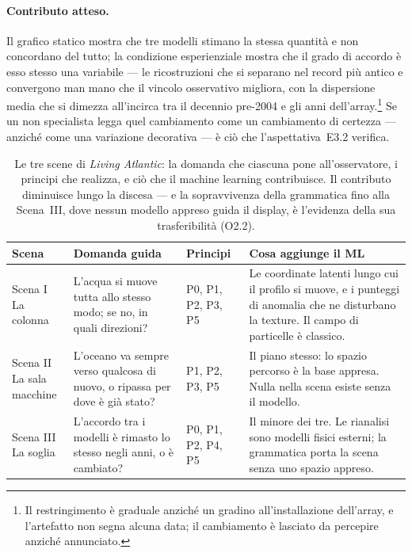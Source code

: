 \paragraph{Contributo atteso.} Il grafico statico mostra che tre modelli stimano la stessa quantità e non concordano del tutto; la condizione esperienziale mostra che il grado di accordo è esso stesso una variabile --- le ricostruzioni che si separano nel record più antico e convergono man mano che il vincolo osservativo migliora, con la dispersione media che si dimezza all'incirca tra il decennio pre-2004 e gli anni dell'array.\footnote{Il restringimento è graduale anziché un gradino all'installazione dell'array, e l'artefatto non segna alcuna data; il cambiamento è lasciato da percepire anziché annunciato.} Se un non specialista legga quel cambiamento come un cambiamento di certezza --- anziché come una variazione decorativa --- è ciò che l'aspettativa~E3.2 verifica.

\begin{table}[tbp]
\centering
\caption[Le tre scene a colpo d'occhio]{Le tre scene di \emph{Living Atlantic}: la domanda che ciascuna pone all'osservatore, i principi che realizza, e ciò che il machine learning contribuisce. Il contributo diminuisce lungo la discesa --- e la sopravvivenza della grammatica fino alla Scena~III, dove nessun modello appreso guida il display, è l'evidenza della sua trasferibilità (O2.2).}
\label{tab:scene-summary}
\small
\renewcommand{\arraystretch}{1.35}

\begin{tabularx}{\textwidth}{@{}p{2.6cm} X p{2.5cm} X@{}}
\toprule
\textbf{Scena} &
\textbf{Domanda guida} &
\textbf{Principi} &
\textbf{Cosa aggiunge il ML} \\
\midrule

\makecell[l]{Scena I\\La colonna} &
L'acqua si muove tutta allo stesso modo; se no, in quali direzioni? &
P0, P1, P2, P3, P5 &
Le coordinate latenti lungo cui il profilo si muove, e i punteggi di anomalia che ne disturbano la texture. Il campo di particelle è classico. \\

\makecell[l]{Scena II\\La sala macchine} &
L'oceano va sempre verso qualcosa di nuovo, o ripassa per dove è già stato? &
P1, P2, P3, P5 &
Il piano stesso: lo spazio percorso è la base appresa. Nulla nella scena esiste senza il modello. \\

\makecell[l]{Scena III\\La soglia} &
L'accordo tra i modelli è rimasto lo stesso negli anni, o è cambiato? &
P0, P1, P2, P4, P5 &
Il minore dei tre. Le rianalisi sono modelli fisici esterni; la grammatica porta la scena senza uno spazio appreso. \\

\bottomrule
\end{tabularx}
\end{table}
